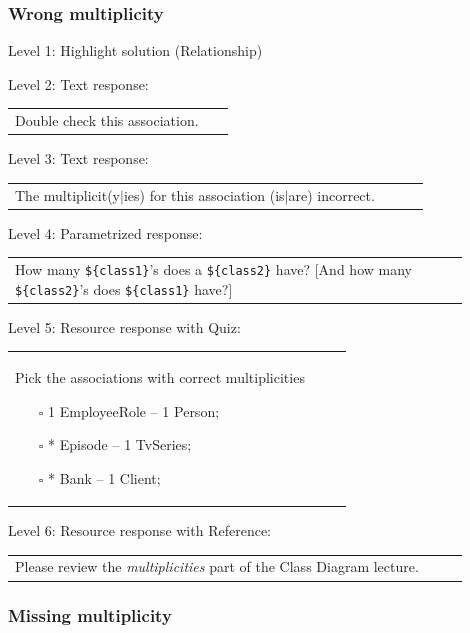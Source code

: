 \subsubsection{Wrong multiplicity}

\noindent Level 1: Highlight solution (Relationship) \medskip

\noindent Level 2: Text response: \medskip

\begin{tabular}{|p{0.9\linewidth}}
Double check this association.
\end{tabular} \medskip

\noindent Level 3: Text response: \medskip

\begin{tabular}{|p{0.9\linewidth}}
The multiplicit(y$|$ies) for this association (is$|$are) incorrect.
\end{tabular} \medskip

\noindent Level 4: Parametrized response: \medskip

\begin{tabular}{|p{0.9\linewidth}}
How many \verb|${class1}|'s does a \verb|${class2}| have? [And how many \verb|${class2}|'s does \verb|${class1}| have?]
\end{tabular} \medskip

\noindent Level 5: Resource response with Quiz: \medskip

\begin{tabular}{|p{0.9\linewidth}}
Pick the associations with correct multiplicities

\begin{itemize}
    \item[$\square$] 1 EmployeeRole -- 1 Person;
    \item[$\square$] * Episode -- 1 TvSeries;
    \item[$\square$] * Bank -- 1 Client;
\end{itemize}

\end{tabular} \medskip

\noindent Level 6: Resource response with Reference: \medskip

\begin{tabular}{|p{0.9\linewidth}}
Please review the \textit{multiplicities} part of the Class Diagram lecture.
\end{tabular} \medskip


\subsubsection{Missing multiplicity}

